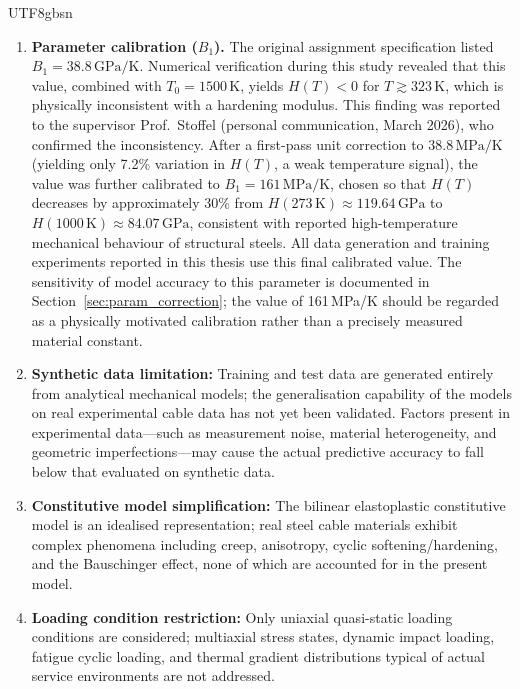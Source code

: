 \documentclass[a4paper,12pt]{report}
\begin{document}
\begin{CJK}{UTF8}{gbsn}
\begin{enumerate}
  \item \textbf{Parameter calibration ($B_1$).}\label{lim:B1}
    The original assignment specification listed $B_1 = 38.8\,\text{GPa/K}$.
    Numerical verification during this study revealed that this value, combined with
    $T_0 = 1500\,\text{K}$, yields $H(T) < 0$ for $T \gtrsim 323\,\text{K}$, which
    is physically inconsistent with a hardening modulus. This finding was reported to
    the supervisor Prof.\ Stoffel (personal communication, March 2026), who confirmed
    the inconsistency. After a first-pass unit correction to $38.8\,\text{MPa/K}$
    (yielding only 7.2\% variation in $H(T)$, a weak temperature signal), the value
    was further calibrated to $B_1 = 161\,\text{MPa/K}$, chosen so that
    $H(T)$ decreases by approximately 30\% from $H(273\,\text{K}) \approx 119.64\,\text{GPa}$
    to $H(1000\,\text{K}) \approx 84.07\,\text{GPa}$, consistent with reported
    high-temperature mechanical behaviour of structural steels. All data generation and
    training experiments reported in this thesis use this final calibrated value.
    The sensitivity of model accuracy to this parameter is documented in
    Section~\ref{sec:param_correction}; the value of 161\,MPa/K should be regarded as a
    physically motivated calibration rather than a precisely measured material constant.
  \item \textbf{Synthetic data limitation:} Training and test data are generated entirely
    from analytical mechanical models; the generalisation capability of the models on
    real experimental cable data has not yet been validated. Factors present in
    experimental data---such as measurement noise, material heterogeneity, and geometric
    imperfections---may cause the actual predictive accuracy to fall below that evaluated
    on synthetic data.
  \item \textbf{Constitutive model simplification:} The bilinear elastoplastic
    constitutive model is an idealised representation; real steel cable materials
    exhibit complex phenomena including creep, anisotropy, cyclic softening/hardening,
    and the Bauschinger effect, none of which are accounted for in the present model.
  \item \textbf{Loading condition restriction:} Only uniaxial quasi-static loading
    conditions are considered; multiaxial stress states, dynamic impact loading, fatigue
    cyclic loading, and thermal gradient distributions typical of actual service
    environments are not addressed.

\end{enumerate}
\end{CJK}
\end{document}
